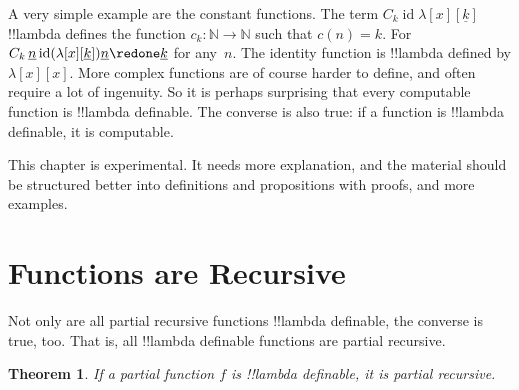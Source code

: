 \documentclass[10pt,a4paper]{article}
\theoremstyle{plain}
\newtheorem{thm}{Theorem}[section]
\theoremstyle{definition}
\theoremstyle{remark}
\newenvironment{editorial}{}{}
\newcommand*{\olfileid}[3]{}
\newcommand*{\olsection}[1]{\section*{#1}}
\newcommand*{\olchapter}[3]{}
\newcommand*{\olimport}[1]{}
\newcommand*{\ollabel}[1]{\label{#1}}
\providecommand{\num}[1]{\underline{#1}}
\providecommand{\Nat}{\ensuremath{\mathbb{N}}}
\providecommand{\lambd}{\ensuremath{\lambda}}
\providecommand{\ident}{\operatorname{id}}
\begin{document}
A very simple example are the constant functions. The term $C_k \ident
\lambd[x][\num{k}]$ !!{lambda define}s the function $c_k\colon \Nat \to
\Nat$ such that $c(n) = k$. For $C_k \, \num n \ident
(\lambd[x][\num{k}])\num n \redone \num{k}$ for any~$n$. The identity
function is !!{lambda defined} by $\lambd[x][x]$. More complex
functions are of course harder to define, and often require a lot of
ingenuity. So it is perhaps surprising that every computable function
is !!{lambda definable}. The converse is also true: if a function is
!!{lambda definable}, it is computable.





\olchapter{lam}{rep}{Lambda Definability}

\begin{editorial}
  This chapter is experimental. It needs more explanation, and the
  material should be structured better into definitions and
  propositions with proofs, and more examples.
\end{editorial}

\olimport{introduction}
\olimport{arithmetical-functions}
\olimport{pairs}
\olimport{truth-values}
\olimport{primitive-recursive-functions}
\olimport{fixpoints}
\olimport{minimization}
\olimport{partial-recursive-functions}
\olimport{lambda-definable-recursive}

\OLEndChapterHook





\olfileid{lam}{dfl}{ldr}
\olsection{ Functions are Recursive}

Not only are all partial recursive functions !!{lambda definable}, the
converse is true, too. That is, all !!{lambda definable} functions are
partial recursive.

\begin{thm}
  \ollabel{thm:lambda-computable} If a partial function $f$ is
  !!{lambda definable}, it is partial recursive.
\end{thm}
\end{document}
